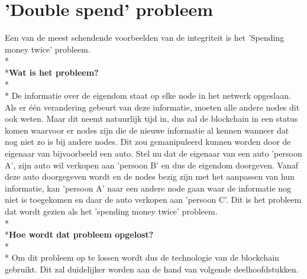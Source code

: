 \documentclass[fleqn,a4paper,12pt]{book}
\begin{document}
\section{'Double spend' probleem}
Een van de meest schendende voorbeelden van de integriteit is het 'Spending money twice' probleem.
\\*\\*\textbf{Wat is het probleem?}\\*\\*
De informatie over de eigendom staat op elke node in het netwerk opgeslaan. Als er één verandering gebeurt van deze informatie, moeten alle andere nodes dit ook weten. Maar dit neemt natuurlijk tijd in, dus zal de blockchain in een status komen waarvoor er nodes zijn die de nieuwe informatie al kennen wanneer dat nog niet zo is bij andere nodes. Dit zou gemanipuleerd kunnen worden door de eigenaar van bijvoorbeeld een auto. Stel nu dat de eigenaar van een auto 'persoon A', zijn auto wil verkopen aan 'persoon B' en dus de eigendom doorgeven. Vanaf deze auto doorgegeven wordt en de nodes bezig zijn met het aanpassen van hun informatie, kan 'persoon A' naar een andere node gaan waar de informatie nog niet is toegekomen en daar de auto verkopen aan 'persoon C'. Dit is het probleem dat wordt gezien als het 'spending money twice' probleem.
\\*\\*\textbf{Hoe wordt dat probleem opgelost?}\\*\\*
Om dit probleem op te lossen wordt dus de technologie van de blockchain gebruikt. Dit zal duidelijker worden aan de hand van volgende deelhoofdstukken.
\end{document}

